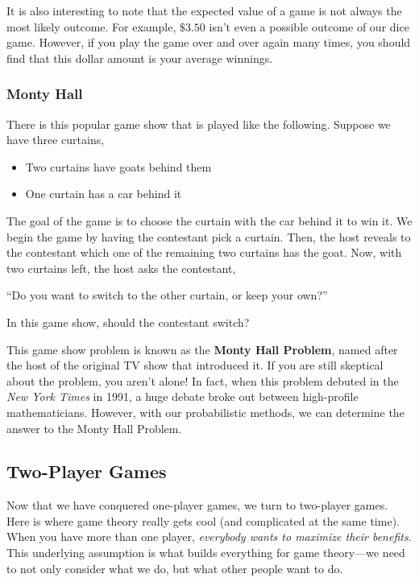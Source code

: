 It is also interesting to note that the expected value of a game is not always the most likely outcome. For example, $\$3.50$ isn't even a possible outcome of our dice game. However, if you play the game over and over again many times, you should find that this dollar amount is your average winnings.

\subsubsection{Monty Hall}
There is this popular game show that is played like the following. Suppose we have three curtains, 

\begin{itemize}
    \item Two curtains have goats behind them
    \item One curtain has a car behind it
\end{itemize}

The goal of the game is to choose the curtain with the car behind it to win it. We begin the game by having the contestant pick a curtain. Then, the host reveals to the contestant which one of the remaining two curtains has the goat. Now, with two curtains left, the host asks the contestant,
\begin{center}
``Do you want to switch to the other curtain, or keep your own?''
\end{center}

\begin{problem}
In this game show, should the contestant switch?
\end{problem}

This game show problem is known as the \textbf{Monty Hall Problem}, named after the host of the original TV show that introduced it. If you are still skeptical about the problem, you aren't alone! In fact, when this problem debuted in the \textit{New York Times} in 1991, a huge debate broke out between high-profile mathematicians. However, with our probabilistic methods, we can determine the answer to the Monty Hall Problem.

\subsection{Two-Player Games}
Now that we have conquered one-player games, we turn to two-player games. Here is where game theory really gets cool (and complicated at the same time). When you have more than one player, \textit{everybody wants to maximize their benefits}. This underlying assumption is what builds everything for game theory---we need to not only consider what we do, but what other people want to do.

